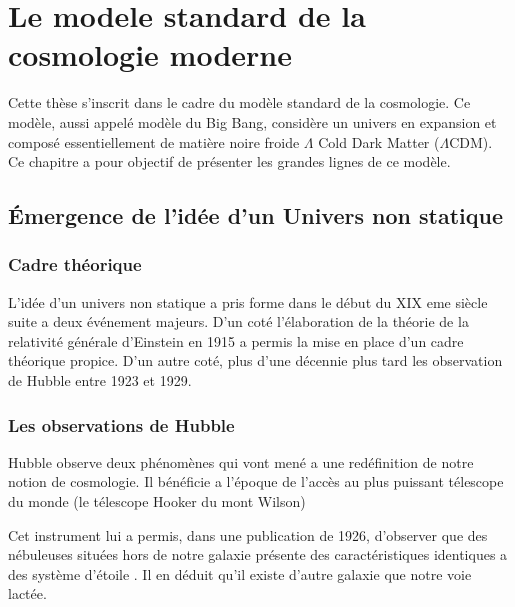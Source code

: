 \chapter{Le modele standard de la cosmologie moderne} \label{ch:introduction_physique}

Cette thèse s'inscrit dans le cadre du modèle standard de la cosmologie.
Ce modèle, aussi appelé modèle du Big Bang, considère un univers en expansion et composé essentiellement de matière noire froide $\Lambda$ Cold Dark Matter ($\Lambda$CDM).
Ce chapitre a pour objectif de présenter les grandes lignes de ce modèle.


\section{Émergence de l'idée d'un Univers non statique}


\subsection{Cadre théorique}

L'idée d'un univers non statique a pris forme dans le début du XIX eme siècle suite a deux événement majeurs.
D'un coté l'élaboration de la théorie de la relativité générale d'Einstein en 1915 a permis la mise en place d'un cadre théorique propice.
D'un autre coté, plus d'une décennie plus tard les observation de Hubble entre 1923 et 1929.

\subsection{Les observations de Hubble}

Hubble observe deux phénomènes qui vont mené a une redéfinition de notre notion de cosmologie.
Il bénéficie a l'époque de l'accès au plus puissant télescope du monde (le télescope Hooker du mont Wilson)

Cet instrument lui a permis, dans une publication de 1926, d'observer que des nébuleuses situées hors de notre galaxie présente des caractéristiques identiques a des système d'étoile \citep{1926ApJ....63..236H}.
Il en déduit qu'il existe d'autre galaxie que notre voie lactée.

